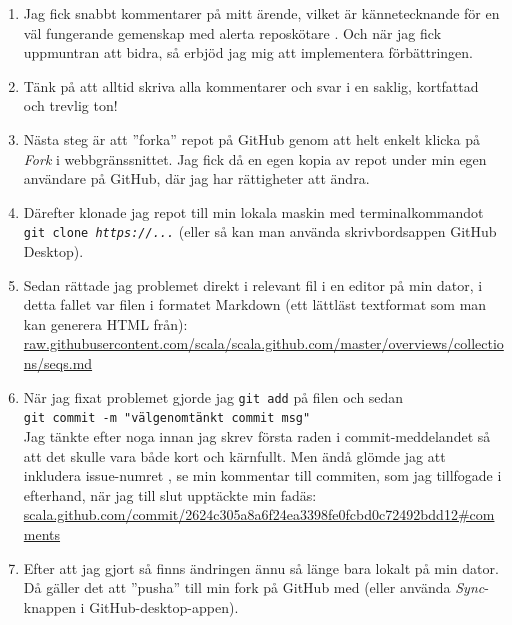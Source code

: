 \begin{enumerate}
\item Jag fick snabbt kommentarer på mitt ärende, vilket är kännetecknande för en väl fungerande gemenskap  med alerta reposkötare  . Och när jag fick uppmuntran att bidra, så erbjöd jag mig att implementera förbättringen.

\item Tänk på att alltid skriva alla kommentarer och svar i en saklig, kortfattad och trevlig ton!

\item Nästa steg är att ''forka'' repot på GitHub genom att helt enkelt klicka på \emph{Fork} i webbgränssnittet. Jag fick då en egen kopia av repot under min egen användare på GitHub, där jag har rättigheter att ändra.

\item Därefter klonade jag repot till min lokala maskin med terminalkommandot \texttt{ git clone \emph{https://...}} (eller så kan man använda skrivbordsappen GitHub Desktop).

\item Sedan rättade jag problemet direkt i relevant fil i en editor på min dator, i detta fallet var filen i formatet Markdown (ett lättläst textformat som man kan generera HTML från): \\ {\small\href{https://raw.githubusercontent.com/scala/scala.github.com/master/overviews/collections/seqs.md}{raw.githubusercontent.com/scala/scala.github.com/master/overviews/collections/seqs.md}}

\item När jag fixat problemet gjorde jag \texttt{git add} på filen och sedan \\ \texttt{git commit -m "välgenomtänkt commit msg"} \\ Jag tänkte efter noga innan jag skrev första raden i commit-meddelandet så att det skulle vara både kort och kärnfullt. Men ändå glömde jag att inkludera issue-numret \code{:(}, se min kommentar till commiten, som jag tillfogade i efterhand, när jag till slut upptäckte min fadäs:\\ {\small\href{https://github.com/bjornregnell/scala.github.com/commit/2624c305a8a6f24ea3398fe0fcbd0c72492bdd12#comments}{scala.github.com/commit/2624c305a8a6f24ea3398fe0fcbd0c72492bdd12\#comments}}

\item Efter att jag gjort  så finns ändringen ännu så länge bara lokalt på min dator. Då gäller det att ''pusha'' till min fork på GitHub med  (eller använda \emph{Sync}-knappen i GitHub-desktop-appen).


\end{enumerate}
